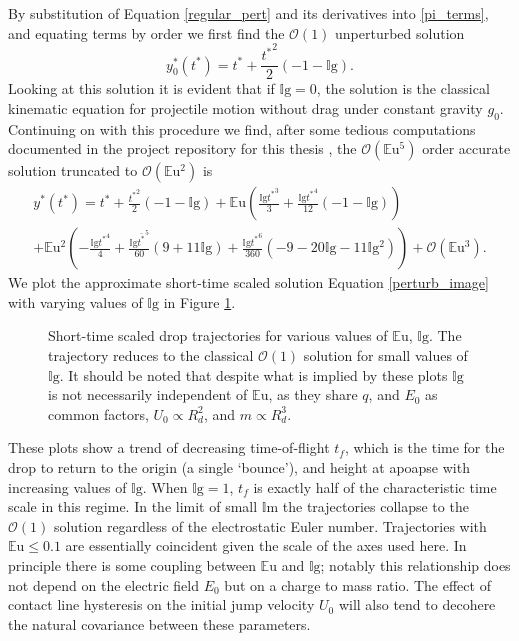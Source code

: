 \documentclass[12pt,a4paper,oneside]{book}
\begin{document}
By substitution of Equation \ref{regular_pert} and its derivatives into \ref{pi_terms}, and equating terms by order we first find the $\mathcal{O}(1)$ unperturbed solution
\[{y^*_{0}}{\left ({t^*} \right )} = {t^*} + \frac{{t^*}^{2}}{2} \left(-1 - \mathbb{I}\mbox{g}\right). \]
Looking at this solution it is evident that if $\mathbb{I}\mbox{g}=0$, the solution is the classical kinematic equation for projectile motion without drag under constant gravity $g_0$. Continuing on with this procedure we find, after some tedious computations documented in the project repository for this thesis \cite{schmidt_droplet_electro-bounce:_2017}, the $\mathcal{O}(\mathbb{E}\mbox{u}^5)$ order accurate solution truncated to $\mathcal{O}(\mathbb{E}\mbox{u}^2)$ is
\begin{eqnarray}
\label{perturb_image}
&{y^*}({t^*}) = {t^*} + \frac{{t^*}^{2}}{2} \left(-1 - \mathbb{I}\mbox{g}\right) + \mathbb{E}\mbox{u} \left(\frac{\mathbb{I}\mbox{g} {t^*}^{3}}{3} + \frac{\mathbb{I}\mbox{g} {t^*}^{4}}{12} \left(-1 - \mathbb{I}\mbox{g} \right)\right)& \\
&+ \mathbb{E}\mbox{u}^{2} \left(- \frac{\mathbb{I}\mbox{g} {t^*}^{4}}{4} + \frac{\mathbb{I}\mbox{g} \bar{t^*}^{5}}{60} \left(9 + 11 \mathbb{I}\mbox{g} \right) + \frac{\mathbb{I}\mbox{g} {t^*}^{6}}{360} \left(-9 - 20 \mathbb{I}\mbox{g} - 11 \mathbb{I}\mbox{g}^{2}\right)\right) + \mathcal{O}(\mathbb{E}\mbox{u}^3).&\nonumber
\end{eqnarray}
We plot the approximate short-time scaled solution Equation \ref{perturb_image} with varying values of $\mathbb{I}\mbox{g}$ in Figure \ref{fig:short_times}.
\begin{figure}[htb]
    \centering
    \resizebox{1\textwidth}{!}{}
    \caption{Short-time scaled drop trajectories for various values of $\mathbb{E}\mbox{u}$, $\mathbb{I}\mbox{g}$. The trajectory reduces to the classical $\mathcal{O}(1)$ solution for small values of $\mathbb{I}\mbox{g}$. It should be noted that despite what is implied by these plots $\mathbb{I}\mbox{g}$ is not necessarily independent of $\mathbb{E}\mbox{u}$, as they share $q$, and $E_0$ as common factors, $U_0 \propto R_d^2$, and $m \propto R_d^3$.}
    \label{fig:short_times}
\end{figure}
These plots show a trend of decreasing time-of-flight $t_f$, which is the time for the drop to return to the origin (a single `bounce'), and height at apoapse with increasing values of $\mathbb{I}\mbox{g}$. When $\mathbb{I}\mbox{g} = 1$, $t_f$ is exactly half of the characteristic time scale in this regime. In the limit of small $\mathbb{I}\mbox{m}$ the trajectories collapse to the $\mathcal{O}(1)$ solution regardless of the electrostatic Euler number. Trajectories with $\mathbb{E}\mbox{u} \leq 0.1$ are essentially coincident given the scale of the axes used here. In principle there is some coupling between $\mathbb{E}\mbox{u}$ and $\mathbb{I}\mbox{g}$; notably this relationship does not depend on the electric field $E_0$ but on a charge to mass ratio. The effect of contact line hysteresis on the initial jump velocity $U_0$ will also tend to decohere the natural covariance between these parameters.
\end{document}
